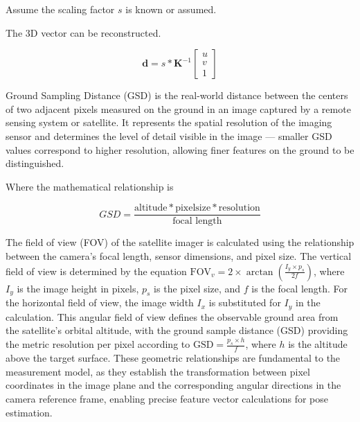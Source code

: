 Assume the scaling factor $s$ is known or assumed.

The 3D vector can be reconstructed.

\begin{equation}
\mathbf{d} = s*\mathbf{K}^{-1}
\begin{bmatrix}
    u \\
    v \\
    1
\end{bmatrix}
\end{equation}




Ground Sampling Distance (GSD) is the real-world distance between the centers of two adjacent 
pixels measured on the ground in an image captured by a remote sensing system or satellite. It represents 
the spatial resolution of the imaging sensor and determines the level of detail visible in the image — smaller GSD 
values correspond to higher resolution, allowing finer features on the ground to be distinguished.

Where the mathematical relationship is

\begin{equation}
    GSD = \frac{\text{altitude} * \text{pixelsize} * \text{resolution}}{\text{focal length}}
\end{equation}






The field of view (FOV) of the satellite imager is calculated using the relationship between the camera's focal length, 
sensor dimensions, and pixel size. The vertical field of view is determined by the equation $\text{FOV}_v = 2 \times \arctan\left(\frac{I_y \times p_s}{2f}\right)$, 
where $I_y$ is the image height in pixels, $p_s$ is the pixel size, and $f$ is the focal length. For the horizontal field of view, the image width $I_x$ is 
substituted for $I_y$ in the calculation. This angular field of view defines the observable ground area from the satellite's orbital altitude, with the ground 
sample distance (GSD) providing the metric resolution per pixel according to $\text{GSD} = \frac{p_s \times h}{f}$, where $h$ is the altitude above the target 
surface. These geometric relationships are fundamental to the measurement model, as they establish the transformation between pixel coordinates in the image plane 
and the corresponding angular directions in the camera reference frame, enabling precise feature vector calculations for pose estimation.

